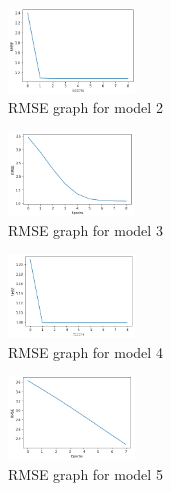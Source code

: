 \documentclass[final]{cvpr}
\begin{document}
\begin{figure}[!htbp]
	\includegraphics[width=0.3\textwidth]{screenshot20210415234346.png}
	\caption{RMSE graph for model 2}
\end{figure}

\begin{figure}[!htbp]
	\includegraphics[width=0.3\textwidth]{screenshot20210415234450.png}
	\caption{RMSE graph for model 3}
\end{figure}

\begin{figure}[!htbp]
	\includegraphics[width=0.3\textwidth]{screenshot20210415234538.png}
	\caption{RMSE graph for model 4}
\end{figure}

\begin{figure}[!htbp]
	\includegraphics[width=0.3\textwidth]{screenshot20210415234604.png}
	\caption{RMSE graph for model 5}
\end{figure}
\end{document}
